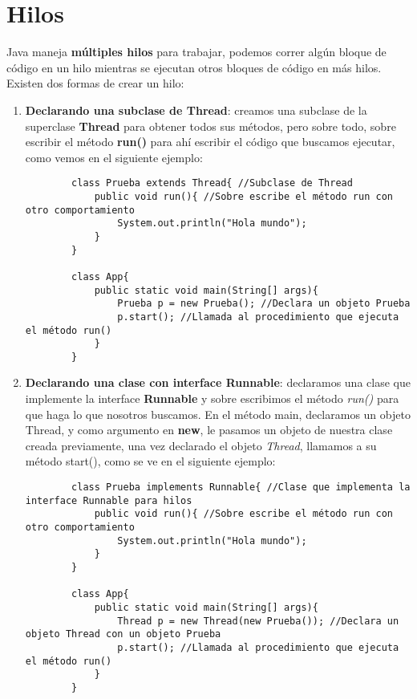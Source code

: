 \section{Hilos}
Java maneja \textbf{múltiples hilos} para trabajar, podemos correr algún bloque de código en un hilo mientras se ejecutan otros bloques de código en más hilos. Existen dos formas de crear un hilo:
\begin{enumerate}
    \item \textbf{Declarando una subclase de Thread}: creamos una subclase de la superclase \textbf{Thread} para obtener todos sus métodos, pero sobre todo, sobre escribir el método \textbf{run()} para ahí              escribir el código que buscamos ejecutar, como vemos en el siguiente ejemplo:
    \begin{lstlisting}
        class Prueba extends Thread{ //Subclase de Thread
            public void run(){ //Sobre escribe el método run con otro comportamiento
                System.out.println("Hola mundo");
            }
        }
        
        class App{
            public static void main(String[] args){
                Prueba p = new Prueba(); //Declara un objeto Prueba
                p.start(); //Llamada al procedimiento que ejecuta el método run()
            }
        }
    \end{lstlisting}
    \item \textbf{Declarando una clase con interface Runnable}: declaramos una clase que implemente la interface \textbf{Runnable} y sobre escribimos el método \textit{run()} para que haga lo que nosotros                buscamos. En el método main, declaramos un objeto Thread, y como argumento en \textbf{new}, le pasamos un objeto de nuestra clase creada previamente, una vez declarado el objeto \textit{Thread},            llamamos a su método start(), como se ve en el siguiente ejemplo:
    \begin{lstlisting}
        class Prueba implements Runnable{ //Clase que implementa la interface Runnable para hilos
            public void run(){ //Sobre escribe el método run con otro comportamiento
                System.out.println("Hola mundo");
            }
        }
        
        class App{
            public static void main(String[] args){
                Thread p = new Thread(new Prueba()); //Declara un objeto Thread con un objeto Prueba
                p.start(); //Llamada al procedimiento que ejecuta el método run()
            }
        }
    \end{lstlisting}
\end{enumerate}
